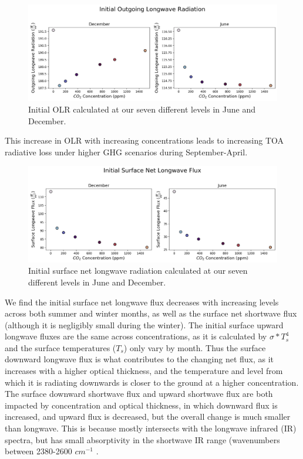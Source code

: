 \documentclass[12]{article}
\begin{document}
\begin{figure}[htb!]
\noindent\includegraphics[width=1\textwidth]{figures/OLR_init.png}
\centering
\caption{Initial OLR calculated at our seven different  levels in June and December.}
\label{fig:init_OLR}
\end{figure}

This increase in OLR with increasing  concentrations leads to increasing TOA radiative loss under higher GHG scenarios during September-April. 

\begin{figure}[htb!]
\noindent\includegraphics[width=1\textwidth]{figures/sfcLW_init.png}
\centering
\caption{Initial surface net longwave radiation calculated at our seven different  levels in June and December.}
\label{fig:init_sfc_LW}
\end{figure}

We find the initial surface net longwave flux decreases with increasing  levels across both summer and winter months, as well as the surface net shortwave flux (although it is negligibly small during the winter).  The initial surface upward longwave fluxes are the same across  concentrations, as it is calculated by $\sigma*T_s^4$ and the surface temperatures ($T_s$) only vary by month. Thus the surface downward longwave flux is what contributes to the changing net flux, as it increases with a higher optical thickness, and the temperature and level from which it is radiating downwards is closer to the ground at a higher  concentration. The surface downward shortwave flux and upward shortwave flux are both impacted by  concentration and optical thickness, in which downward flux is increased, and upward flux is decreased, but the overall change is much smaller than longwave. This is because  mostly intersects with the longwave infrared (IR) spectra, but has small absorptivity in the shortwave IR range (wavenumbers between 2380-2600 $cm^{-1}$ \citep{mlawer_radiative_1997}. 
\end{document}
